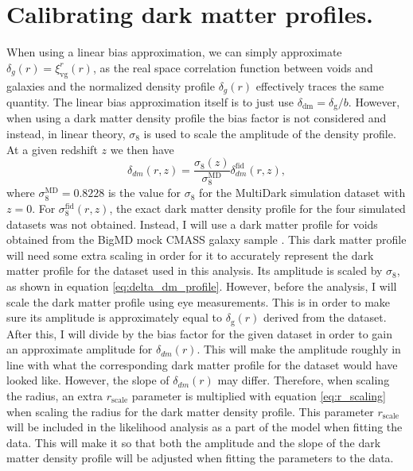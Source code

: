 \section{Calibrating dark matter profiles.}\label{sec:dm_calibrate}
When using a linear bias approximation, we can simply approximate $\delta_g(r)=\xi_{\mathrm{vg}}^r(r)$, as the real space correlation function between voids and galaxies and the normalized density profile $\delta_g(r)$ effectively traces the same quantity. The linear bias approximation itself is to just use $\delta_{\mathrm{dm}}=\delta_\mathrm{g}/b$. However, when using a dark matter density profile the bias factor is not considered and instead, in linear theory, $\sigma_8$ is used to scale the amplitude of the density profile. At a given redshift $z$ we then have
\begin{equation}\label{eq:delta_dm_profile}
    \delta_{dm}(r,z) = \frac{\sigma_8(z)}{\sigma_8^{\mathrm{MD}}}\delta_{dm}^\mathrm{fid}(r,z),
\end{equation}
where $\sigma_8^{\mathrm{MD}}=0.8228$ is the value for $\sigma_8$ for the MultiDark simulation dataset with $z=0$. For $\sigma_8^\mathrm{fid}(r,z)$, the exact dark matter density profile for the four simulated datasets was not obtained. Instead, I will use a dark matter profile for voids obtained from the BigMD mock CMASS galaxy sample \cite{Dawson_2012}. This dark matter profile will need some extra scaling in order for it to accurately represent the dark matter profile for the dataset used in this analysis. Its amplitude is scaled by $\sigma_8$, as shown in equation \ref{eq:delta_dm_profile}. However, before the analysis, I will scale the dark matter profile using eye measurements. This is in order to make sure its amplitude is approximately equal to $\delta_\mathrm{g}(r)$ derived from the dataset.  After this, I will divide by the bias factor for the given dataset in order to gain an approximate amplitude for $\delta_{dm}(r)$. This will make the amplitude roughly in line with what the corresponding dark matter profile for the dataset would have looked like. However, the slope of $\delta_{dm}(r)$ may differ. Therefore, when scaling the radius, an extra $r_\mathrm{scale}$ parameter is multiplied with equation \ref{eq:r_scaling} when scaling the radius for the dark matter density profile. This parameter $r_\mathrm{scale}$ will be included in the likelihood analysis as a part of the model when fitting the data. This will make it so that both the amplitude and the slope of the dark matter density profile will be adjusted when fitting the parameters to the data.
